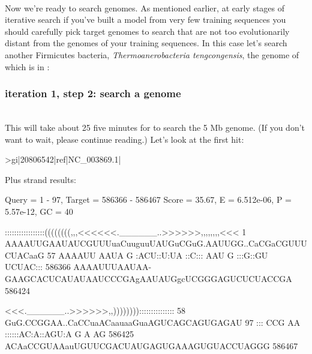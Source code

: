 \\

Now we're ready to search genomes. As mentioned earlier, at early
stages of iterative search if you've built a model from very few
training sequences you should carefully pick target genomes to search that are
not too evolutionarily distant from the genomes of your training
sequences. In this case let's search another Firmicutes bacteria,
\emph{Thermoanerobacteria tengcongensis}, the genome of which is in \newline
{}:

\subsubsection{iteration 1, step 2: search a genome}

\\

This will take about 25 five minutes for  to search the 5 Mb
genome. (If you don't want to wait, please continue reading.)
Let's look at the first hit:

{\samepage
\begin{sreoutput}
>gi|20806542|ref|NC_003869.1|

  Plus strand results:

 Query = 1 - 97, Target = 586366 - 586467
 Score = 35.67, E = 6.512e-06, P = 5.57e-12, GC =  40

           :::::::::::::::::((((((((,,,<<<<<<.______..>>>>>>,,,,,,,,<<<
         1 AAAAUUGAAUAUCGUUUuaCuuguuUAUGuCGuG.AAUUGG..CaCGaCGUUUCUACaaG 57      
           AAAAUU AAUA  G   :ACU::U:UA ::C::: AAU  G  :::G::GU UCUAC:::
    586366 AAAAUUUAAUAA-GAAGCACUCAUAUAAUCCCGAgAAUAUGgcUCGGGAGUCUCUACCGA 586424  

           <<<.______..>>>>>>,,)))))))):::::::::::::::
        58 GuG.CCGGAA..CaCCuaACaauaaGuaAGUCAGCAGUGAGAU 97      
           ::: CCG AA  ::::::AC:A::AGU:A    G A   AG  
    586425 ACAaCCGUAAauUGUUCGACUAUGAGUGAAAGUGUACCUAGGG 586467  
\end{sreoutput}
}

